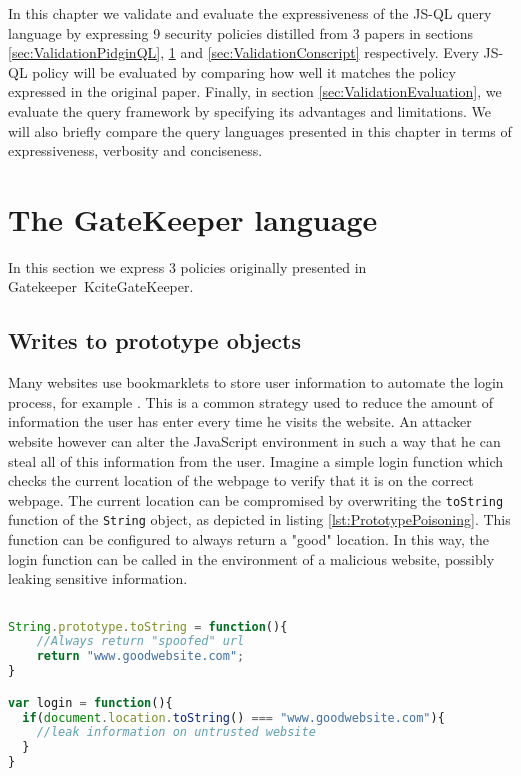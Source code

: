 In this chapter we validate and evaluate the expressiveness of the JS-QL query language by expressing 9 security policies distilled from 3 papers in sections \ref{sec:ValidationPidginQL}, \ref{sec:ValidationGK} and \ref{sec:ValidationConscript} respectively. Every JS-QL policy will be evaluated by comparing how well it matches the policy expressed in the original paper. Finally, in section \ref{sec:ValidationEvaluation}, we evaluate the query framework by specifying its advantages and limitations. We will also briefly compare the query languages presented in this chapter in terms of expressiveness, verbosity and conciseness.
\section{The GateKeeper language}
\label{sec:ValidationGK}

In this section we express 3 policies originally presented in Gatekeeper~Kcite{GateKeeper}.

\subsection{Writes to prototype objects}

Many websites use bookmarklets to store user information to automate the login process, for example \cite{PrototypePoisoning}. This is a common strategy used to reduce the amount of information the user has enter every time he visits the website. An attacker website however can alter the JavaScript environment in such a way that he can steal all of this information from the user. Imagine a simple login function which checks the current location of the webpage to verify that it is on the correct webpage. The current location can be compromised by overwriting the \texttt{toString} function of the \texttt{String} object, as depicted in listing \ref{lst:PrototypePoisoning}. This function can be configured to always return a "good" location. In this way, the login function can be called in the environment of a malicious website, possibly leaking sensitive information.

\begin{lstlisting}[label={lst:PrototypePoisoning},language=JavaScript,caption=Prototype poisoning example,mathescape=true]  % float=t?

String.prototype.toString = function(){
    //Always return "spoofed" url
    return "www.goodwebsite.com";
}

var login = function(){
  if(document.location.toString() === "www.goodwebsite.com"){
    //leak information on untrusted website
  }
}
\end{lstlisting}

